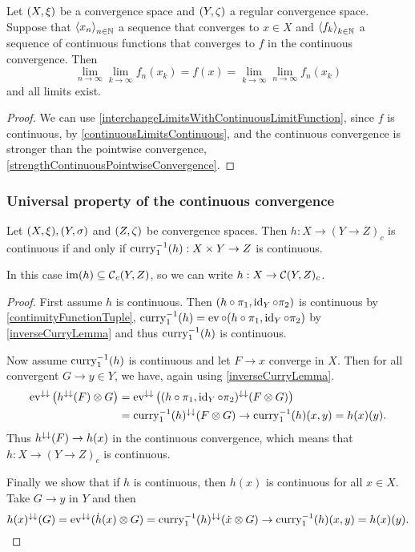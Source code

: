 \begin{lemma} \label{exchangeSequenceLimitsContinuousConvergence}
Let $\sSet{X,\xi}$ be a convergence space and $\sSet{Y,\zeta}$ a regular convergence space. Suppose that $\left\langle x_n \right\rangle_{n\in \mathbb{N}}$ a sequence that converges to $x\in X$ and $\left\langle f_k \right\rangle_{k\in \mathbb{N}}$ a sequence of continuous functions that converges to $f$ in the continuous convergence. Then
\[ \lim_{n\to \infty}\lim_{k\to\infty}f_n(x_k) = f(x) = \lim_{k\to \infty}\lim_{n\to\infty}f_n(x_k) \]
and all limits exist.
\end{lemma}
\begin{proof}
We can use \ref{interchangeLimitsWithContinuousLimitFunction}, since $f$ is continuous, by \ref{continuousLimitsContinuous}, and the continuous convergence is stronger than the pointwise convergence, \ref{strengthContinuousPointwiseConvergence}.
\end{proof}

\subsubsection{Universal property of the continuous convergence}
\begin{proposition} \label{universalPropertyContinuousConvergence}
Let $\sSet{X, \xi}, \sSet{Y,\sigma}$ and $\sSet{Z,\zeta}$ be convergence spaces. Then $h: X\to (Y \to Z)_c$ is continuous \textup{if and only if} $\operatorname{curry}_1^{-1}(h): X\times Y \to Z$ is continuous.

In this case $\operatorname{im}(h) \subseteq \operatorname{\mathcal{C}}_c(Y,Z)$, so we can write $h: X\to \operatorname{\mathcal{C}}(Y,Z)_c$.
\end{proposition}
\begin{proof}
First assume $h$ is continuous. Then $(h\circ \pi_1, \operatorname{id}_Y\circ \pi_2)$ is continuous by \ref{continuityFunctionTuple}, $\operatorname{curry}_1^{-1}(h) = \operatorname{ev} \circ (h\circ \pi_1, \operatorname{id}_Y\circ \pi_2)$ by \ref{inverseCurryLemma} and thus $\operatorname{curry}_1^{-1}(h)$ is continuous.

Now assume $\operatorname{curry}_1^{-1}(h)$ is continuous and let $F\to x$ converge in $X$. Then for all convergent $G\to y\in Y$, we have, again using \ref{inverseCurryLemma}.
\begin{align*}
\operatorname{ev}^{\downarrow\downarrow}\big(h^{\downarrow\downarrow}(F)\otimes G\big) &= \operatorname{ev}^{\downarrow\downarrow}\big((h\circ \pi_1, \operatorname{id}_Y\circ \pi_2)^{\downarrow\downarrow}(F\otimes G)\big) \\
&= \operatorname{curry}_1^{-1}(h)^{\downarrow\downarrow}(F\otimes G) \to \operatorname{curry}_1^{-1}(h)(x,y) = h(x)(y).
\end{align*}
Thus $h^{\downarrow\downarrow}(F) \to h(x)$ in the continuous convergence, which means that $h: X\to (Y \to Z)_c$ is continuous.

Finally we show that if $h$ is continuous, then $h(x)$ is continuous for all $x\in X$. Take $G\to y$ in $Y$ and then
\[ h(x)^{\downarrow\downarrow}(G) = \operatorname{ev}^{\downarrow\downarrow}(\dot{h}(x)\otimes G) = \operatorname{curry}_1^{-1}(h)^{\downarrow\downarrow}(\dot{x}\otimes G) \to \operatorname{curry}_1^{-1}(h)(x,y) = h(x)(y). \]
\end{proof}

